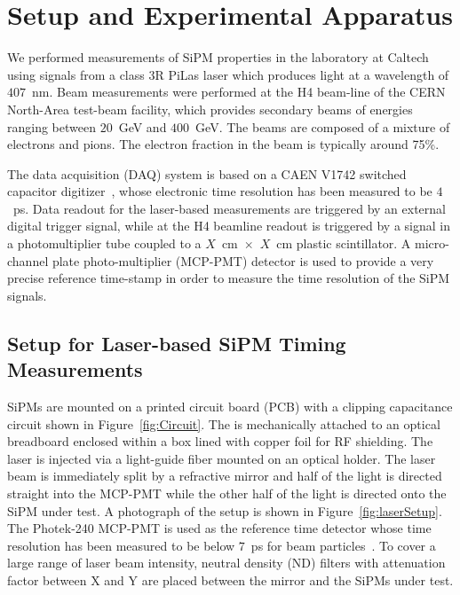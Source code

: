 \section{Setup and Experimental Apparatus }
\label{sec:setup}

We performed measurements of SiPM properties in the laboratory at Caltech using
signals from a class 3R PiLas laser which produces light at a wavelength of
$407$~nm. Beam measurements were performed at the H4 beam-line of the CERN
North-Area test-beam facility, which provides secondary beams of energies
ranging between $20$~GeV and $400$~GeV. The beams are composed of a mixture of
electrons and pions. The electron fraction in the beam is typically around 75\%.

The data acquisition (DAQ) system is based on a CAEN V1742 switched capacitor
digitizer~\cite{DRS4}, whose electronic time resolution has been measured to be
$4$~ps. Data readout for the laser-based measurements are triggered by an
external digital trigger signal, while at the H4 beamline readout is triggered
by a signal in a photomultiplier tube coupled to a
$X$~$\mathrm{cm}$~$\times$~$X$~$\mathrm{cm}$ plastic scintillator. A
micro-channel plate photo-multiplier (MCP-PMT) detector is used to provide a
very precise reference time-stamp in order to measure the time resolution of the 
SiPM signals.

\subsection{Setup for Laser-based SiPM Timing Measurements}

SiPMs are mounted on a printed circuit board (PCB) with a clipping capacitance
circuit shown in Figure~\ref{fig:Circuit}. The is mechanically attached to an
optical breadboard enclosed within a box lined with copper foil for RF
shielding. The laser is injected via a light-guide fiber mounted on an optical
holder. The laser beam is immediately split by a refractive mirror and half of
the light is directed straight into the MCP-PMT while the other half of the
light is directed onto the SiPM under test. A photograph of the setup is shown
in Figure~\ref{fig:laserSetup}. The Photek-240 MCP-PMT is used as the reference
time detector whose time resolution has been measured to be below $7$~ps for
beam particles~\cite{MCPShowerMaxPaper}. To cover a large range of laser beam
intensity, neutral density (ND) filters with attenuation factor between X and Y
are placed between the mirror and the SiPMs under test.


